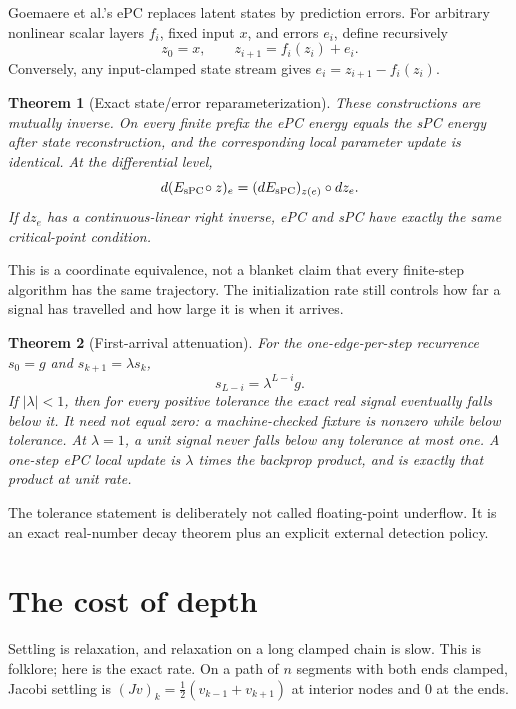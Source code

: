 \documentclass[11pt]{article}
\newtheorem{theorem}{Theorem}[section]
\begin{document}
Goemaere et al.'s ePC \cite{goemaere2025} replaces latent states by prediction errors.
For arbitrary nonlinear scalar layers $f_i$, fixed input $x$, and errors $e_i$, define
recursively
\[
z_0=x,\qquad z_{i+1}=f_i(z_i)+e_i.
\]
Conversely, any input-clamped state stream gives
$e_i=z_{i+1}-f_i(z_i)$.

\begin{theorem}[Exact state/error reparameterization]\label{thm:epc}
These constructions are mutually inverse. On every finite prefix the ePC energy equals
the sPC energy after state reconstruction, and the corresponding local parameter update
is identical. At the differential level,
\[
d(E_{\rm sPC}\!\circ z)_e=(dE_{\rm sPC})_{z(e)}\circ dz_e.
\]
If $dz_e$ has a continuous-linear right inverse, ePC and sPC have exactly the same
critical-point condition.
\end{theorem}

This is a coordinate equivalence, not a blanket claim that every finite-step algorithm
has the same trajectory. The initialization rate still controls how far a signal has
travelled and how large it is when it arrives.

\begin{theorem}[First-arrival attenuation]\label{thm:wave}
For the one-edge-per-step recurrence $s_0=g$ and $s_{k+1}=\lambda s_k$,
\[
s_{L-i}=\lambda^{L-i}g.
\]
If $|\lambda|<1$, then for every positive tolerance the exact real signal eventually
falls below it. It need not equal zero: a machine-checked fixture is nonzero while below
tolerance. At $\lambda=1$, a unit signal never falls below any tolerance at most one.
A one-step ePC local update is $\lambda$ times the backprop product, and is exactly that
product at unit rate.
\end{theorem}

The tolerance statement is deliberately not called floating-point underflow. It is an
exact real-number decay theorem plus an explicit external detection policy.

\section{The cost of depth}
\label{sec:depth}

Settling is relaxation, and relaxation on a long clamped chain is slow. This is folklore;
here is the exact rate. On a path of $n$ segments with both ends clamped, Jacobi settling
is $(Jv)_k = \tfrac12(v_{k-1}+v_{k+1})$ at interior nodes and $0$ at the ends.
\end{document}
